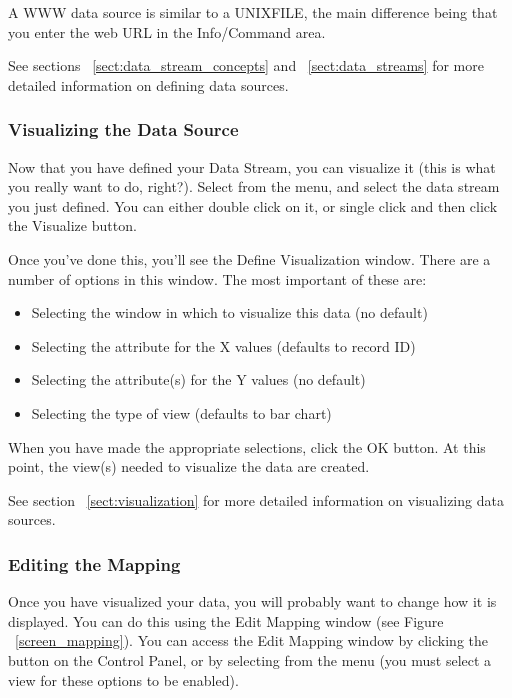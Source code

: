 A WWW data source is similar to a UNIXFILE, the main difference being that
you enter the web URL in the Info/Command area.

See sections ~\ref{sect:data_stream_concepts} and ~\ref{sect:data_streams}
for more detailed information on defining data sources.

\subsubsection{Visualizing the Data Source}

Now that you have defined your Data Stream, you can visualize it (this is what
you really want to do, right?).  Select  from the
 menu, and select the data stream you just defined.  You can
either double click on it, or single click and then click the Visualize button.

Once you've done this, you'll see the Define Visualization window.  There
are a number of options in this window.  The most important of these are:

\begin{itemize}
	\item Selecting the window in which to visualize this data (no default)
	\item Selecting the attribute for the X values (defaults to record ID)
	\item Selecting the attribute(s) for the Y values (no default)
	\item Selecting the type of view (defaults to bar chart)
\end{itemize}

When you have made the appropriate selections, click the OK button.  At this
point, the view(s) needed to visualize the data are created.

See section ~\ref{sect:visualization} for more detailed information on
visualizing data sources.

\subsubsection{Editing the Mapping}

Once you have visualized your data, you will probably want to change how
it is displayed.  You can do this using the Edit Mapping window
(see Figure ~\ref{screen_mapping}).
You can access the Edit Mapping window by clicking the  button
on the Control Panel, or by selecting  from the
 menu (you must select a view for these options to be enabled).

